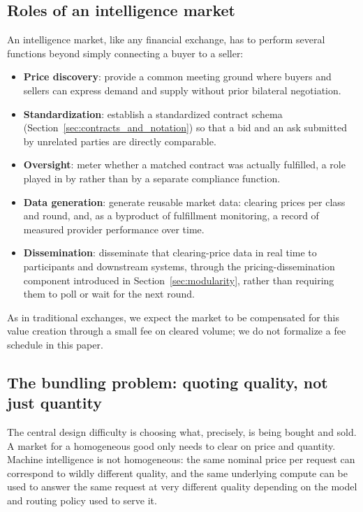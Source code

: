 \subsection{Roles of an intelligence market}
\label{sec:market_roles}

An intelligence market, like any financial exchange, has to perform several
functions beyond simply connecting a buyer to a seller:

\begin{itemize}
  \item \textbf{Price discovery}: provide a common meeting ground where
    buyers and sellers can express demand and supply without prior
    bilateral negotiation.
  \item \textbf{Standardization}: establish a standardized contract schema
    (Section~\ref{sec:contracts_and_notation}) so that a bid and an ask
    submitted by unrelated parties are directly comparable.
  \item \textbf{Oversight}: meter whether a matched contract was actually
    fulfilled, a role played in \Noesis{} by \NoesisServer{} rather than
    by a separate compliance function.
  \item \textbf{Data generation}: generate reusable market data: clearing
    prices per class and round, and, as a byproduct of fulfillment
    monitoring, a record of measured provider performance over time.
  \item \textbf{Dissemination}: disseminate that clearing-price data in
    real time to participants and downstream systems, through the
    pricing-dissemination component introduced in
    Section~\ref{sec:modularity}, rather than requiring them to poll
    \NoesisMarket{} or wait for the next round.
\end{itemize}

As in traditional exchanges, we expect the market to be compensated for this
value creation through a small fee on cleared volume; we do not formalize a fee
schedule in this paper.

\subsection{The bundling problem: quoting quality, not just quantity}
\label{sec:bundling}

The central design difficulty is choosing what, precisely, is being bought and
sold. A market for a homogeneous good only needs to clear on price and
quantity. Machine intelligence is not homogeneous: the same nominal price per
request can correspond to wildly different quality, and the same underlying
compute can be used to answer the same request at very different quality
depending on the model and routing policy used to serve it.

